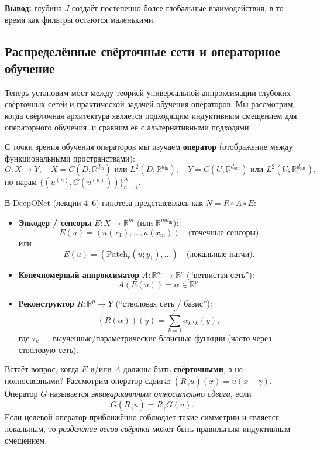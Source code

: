 \documentclass[../NDCNNAI_main.tex]{subfiles}
\begin{document}
\textbf{Вывод:} глубина $J$ создаёт постепенно более глобальные взаимодействия, в то время как фильтры остаются маленькими.

\subsection{Распределённые свёрточные сети и операторное обучение}
Теперь установим мост между теорией универсальной аппроксимации глубоких свёрточных сетей и практической задачей обучения операторов. Мы рассмотрим, когда свёрточная архитектура является подходящим индуктивным смещением для операторного обучения, и сравним её с альтернативными подходами.

С точки зрения обучения операторов мы изучаем \textbf{оператор} (отображение между функциональными пространствами):
\[
G\colon X \to Y, \quad X = C(D; \mathbb{R}^{d_{\text{in}}}) \text{ или } L^2(D; \mathbb{R}^{d_{\text{in}}}), \quad Y = C(U; \mathbb{R}^{d_{\text{out}}}) \text{ или } L^2(U; \mathbb{R}^{d_{\text{out}}}),
\]
по парам $\{(u^{(n)}, G(u^{(n)}))\}_{n=1}^N$.

В DeepONet (лекции 4--6) гипотеза представлялась как $N = R \circ A \circ E$:
\begin{itemize}
    \item \textbf{Энкодер / сенсоры} $E : X \to \mathbb{R}^m$ (или $\mathbb{R}^{md_{\text{in}}}$):
    \[
    E(u) = (u(x_1), \ldots, u(x_m)) \quad \text{(точечные сенсоры)}
    \]
    или
    \[
    E(u) = (\text{Patch}_r(u; y_1), \ldots) \quad \text{(локальные патчи)}.
    \]
    
    \item \textbf{Конечномерный аппроксиматор} $A : \mathbb{R}^m \to \mathbb{R}^p$ (``ветвистая сеть''):
    \[
    A(E(u)) = \alpha \in \mathbb{R}^p.
    \]
    
    \item \textbf{Реконструктор} $R : \mathbb{R}^p \to Y$ (``стволовая сеть / базис''):
    \[
    (R(\alpha))(y) = \sum_{k=1}^p \alpha_k \tau_k(y),
    \]
    где $\tau_k$ --- выученные/параметрические базисные функции (часто через стволовую сеть).
\end{itemize}

Встаёт вопрос, когда $E$ и/или $A$ должны быть \textbf{свёрточными}, а не полносвязными?
Рассмотрим оператор сдвига: $(R_\gamma u)(x) = u(x - \gamma)$. Оператор $G$ называется \emph{эквивариантным относительно сдвига}, если
\[
G(R_\gamma u) = R_\gamma G(u).
\]
Если целевой оператор приближённо соблюдает такие симметрии и является локальным, то \emph{разделение весов свёртки} может быть правильным индуктивным смещением.
\end{document}
